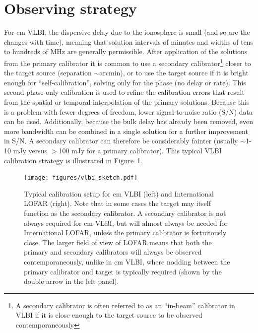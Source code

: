 \documentclass[graybox]{svmult}
\begin{document}
\section{Observing strategy}

For cm VLBI, the dispersive delay due to the ionosphere is small (and so are
the changes with time), meaning that solution intervals of minutes and widths
of tens to hundreds of MHz are generally permissible.  After application of the
solutions from the primary calibrator it is common to use a secondary
calibrator\footnote{A secondary calibrator is often referred to as an
``in-beam'' calibrator in VLBI if it is close enough to the target source to be
observed contemporaneously} closer to the target source (separation
$\sim$arcmin), or to use the target source if it is bright enough for
``self-calibration'', solving only for the phase (no delay or rate). This
second phase-only calibration is used to refine the calibration errors that
result from the spatial or temporal interpolation of the primary solutions.
Because this is a problem with fewer degrees of freedom, lower signal-to-noise
ratio (S/N) data can be used.  Additionally, because the bulk delay has already
been removed, even more bandwidth can be combined in a single solution for a
further improvement in S/N.  A secondary calibrator can therefore be
considerably fainter (usually $\sim$1-10 mJy versus $>$100 mJy for a primary
calibrator).  This typical VLBI calibration strategy is illustrated in
Figure~\ref{fig:calstrategy}.

\begin{figure}[] %
\center
\texttt{[image: figures/vlbi\_sketch.pdf]}
\caption{Typical calibration setup for cm VLBI (left) and International LOFAR
(right).  Note that in some cases the target may itself function as the
secondary calibrator.  A secondary calibrator is not always required for cm
VLBI, but will almost always be needed for International LOFAR, unless the
primary calibrator is fortuitously close.  The larger field of view of LOFAR
means that both the primary and secondary calibrators will always be observed
contemporaneously, unlike in cm VLBI, where nodding between the primary
calibrator and target is typically required (shown by the double arrow in the
left panel).}
\label{fig:calstrategy}
\end{figure}
\end{document}
